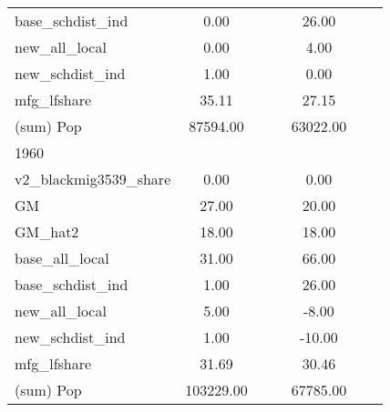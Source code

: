 \begin{table}[htbp]
\begin{tabular}{l*{2}{ccc}}
base\_schdist\_ind    &        0.00&            &            &       26.00&            &            \\
new\_all\_local       &        0.00&            &            &        4.00&            &            \\
new\_schdist\_ind     &        1.00&            &            &        0.00&            &            \\
mfg\_lfshare         &       35.11&            &            &       27.15&            &            \\
(sum) Pop           &    87594.00&            &            &    63022.00&            &            \\
\midrule
1960                &            &            &            &            &            &            \\
v2\_blackmig3539\_share&        0.00&            &            &        0.00&            &            \\
GM                  &       27.00&            &            &       20.00&            &            \\
GM\_hat2             &       18.00&            &            &       18.00&            &            \\
base\_all\_local      &       31.00&            &            &       66.00&            &            \\
base\_schdist\_ind    &        1.00&            &            &       26.00&            &            \\
new\_all\_local       &        5.00&            &            &       -8.00&            &            \\
new\_schdist\_ind     &        1.00&            &            &      -10.00&            &            \\
mfg\_lfshare         &       31.69&            &            &       30.46&            &            \\
(sum) Pop           &   103229.00&            &            &    67785.00&            &            \\
\bottomrule
\end{tabular}
\end{table}
